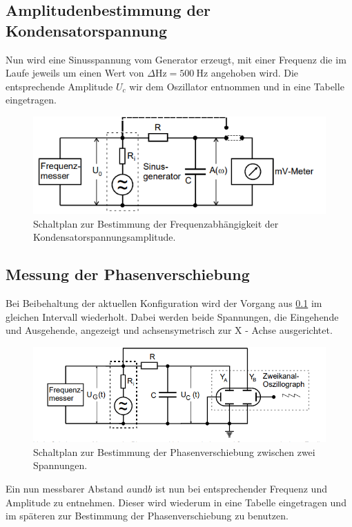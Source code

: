\subsection{Amplitudenbestimmung der Kondensatorspannung}
\label{sectionref}
Nun wird eine Sinusspannung vom Generator erzeugt, mit einer Frequenz die im Laufe jeweils um einen Wert
von $\Delta\si{\hertz}= \SI{500}{\hertz}$ angehoben wird. Die entsprechende Amplitude $U_c$ wir 
dem Oszillator entnommen und in eine Tabelle eingetragen.
 \begin{figure}
    \centering
    \includegraphics[width=\textwidth]{bilder/amplitude.png}
    \caption{Schaltplan zur Bestimmung der Frequenzabhängigkeit der Kondensatorspannungsamplitude.\cite{skript}}
    \label{fig:amp}
\end{figure}


\subsection{Messung der Phasenverschiebung}
Bei Beibehaltung der aktuellen Konfiguration wird der Vorgang aus \ref{sectionref} im gleichen Intervall 
wiederholt. Dabei werden beide Spannungen, die Eingehende und Ausgehende, angezeigt und achsensymetrisch
zur X - Achse ausgerichtet.
\begin{figure}
    \centering
    \includegraphics[width=\textwidth]{bilder/ab.png}
    \caption{Schaltplan zur Bestimmung der Phasenverschiebung zwischen zwei Spannungen.\cite{skript}}
    \label{fig:ab}
\end{figure}

Ein nun messbarer Abstand $a \text{und} b$ %
ist nun bei entsprechender Frequenz und Amplitude zu entnehmen. Dieser wird wiederum in eine Tabelle 
eingetragen und im späteren zur Bestimmung der Phasenverschiebung zu benutzen.

